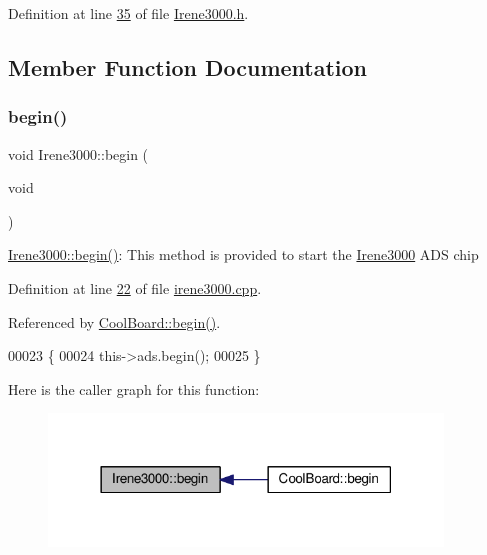 Definition at line \hyperlink{_irene3000_8h_source_l00035}{35} of file \hyperlink{_irene3000_8h_source}{Irene3000.\+h}.



\subsection{Member Function Documentation}
\mbox{\label{class_irene3000_ad5891806c500ae1007afe52b9e304c2b}} 
\subsubsection{\texorpdfstring{begin()}{begin()}}
{\footnotesize\ttfamily void Irene3000\+::begin (\begin{DoxyParamCaption}\item[{void}]{ }\end{DoxyParamCaption})}

\hyperlink{class_irene3000_ad5891806c500ae1007afe52b9e304c2b}{Irene3000\+::begin()}\+: This method is provided to start the \hyperlink{class_irene3000}{Irene3000} A\+DS chip 

Definition at line \hyperlink{irene3000_8cpp_source_l00022}{22} of file \hyperlink{irene3000_8cpp_source}{irene3000.\+cpp}.



Referenced by \hyperlink{_cool_board_8cpp_source_l00021}{Cool\+Board\+::begin()}.


\begin{DoxyCode}
00023 \{
00024     this->ads.begin();
00025 \}
\end{DoxyCode}
Here is the caller graph for this function\+:\nopagebreak
\begin{figure}[H]
\begin{center}
\leavevmode
\includegraphics[width=297pt]{class_irene3000_ad5891806c500ae1007afe52b9e304c2b_icgraph}
\end{center}
\end{figure}
\mbox{\label{class_irene3000_a81f6a79e546679692053f7ac1af49613}} 
